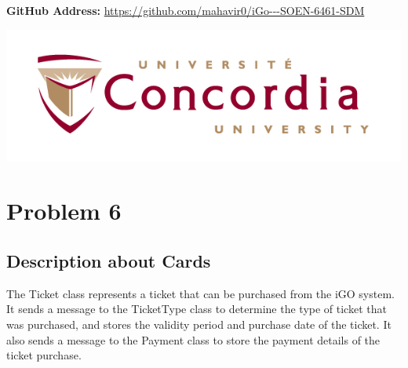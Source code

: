 \documentclass[a4paper, 11pt]{report}
\begin{document}
\begin{titlepage}
	
	
	
	\vfill\vfill\vfill\vfill%
	\textbf{GitHub Address:} \url{https://github.com/mahavir0/iGo---SOEN-6461-SDM}

	
 	\vfill\vfill
 	\includegraphics[scale=0.5]{concordia-logo.png}\\[1cm] %
	 
	
	\vfill %
	
\end{titlepage}



\tableofcontents


\chapter{Problem 6}
\renewcommand{\thesection}{6.\arabic{section}} %
\setcounter{section}{0} %

\section{Description about Cards}
\setlength{\parindent}{0pt}
The Ticket class represents a ticket that can be purchased from the iGO system. It sends a message to the TicketType class to determine the type of ticket that was purchased, and stores the validity period and purchase date of the ticket. It also sends a message to the Payment class to store the payment details of the ticket purchase.\\
\end{document}
